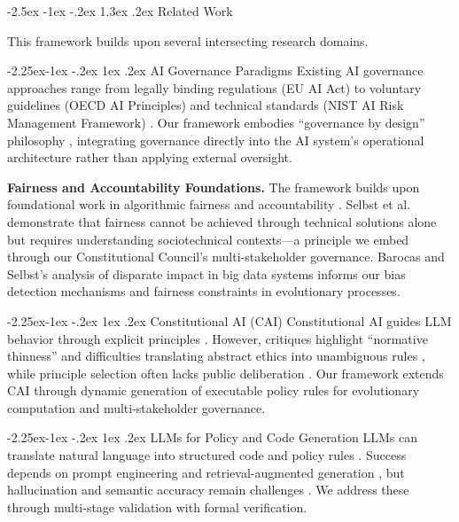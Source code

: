\documentclass[manuscript,screen,review,anonymous,9pt]{acmart}
\makeatletter
\renewcommand\section{\@startsection{section}{1}{\z@}%
  {-2.5ex \@plus -1ex \@minus -.2ex}%
  {1.3ex \@plus.2ex}%
  {\normalfont\Large\bfseries}}
\renewcommand\subsection{\@startsection{subsection}{2}{\z@}%
  {-2.25ex\@plus -1ex \@minus -.2ex}%
  {1ex \@plus .2ex}%
  {\normalfont\large\bfseries}}
\makeatother
\begin{document}
\section{Related Work}
\label{sec:related_work}

This framework builds upon several intersecting research domains.

\subsection{AI Governance Paradigms}
Existing AI governance approaches range from legally binding regulations (EU AI Act) to voluntary guidelines (OECD AI Principles) and technical standards (NIST AI Risk Management Framework) \cite{Wynants2025ETHICAL, WorldBank2024AIGovernance, CambridgeUP2024CorporateGovernance}. Our framework embodies ``governance by design'' philosophy \cite{Engin2025AdaptiveAIGovernance}, integrating governance directly into the AI system's operational architecture rather than applying external oversight.

\textbf{Fairness and Accountability Foundations.} The framework builds upon foundational work in algorithmic fairness and accountability \cite{Selbst2019FairnessAccountability, Barocas2016BigDataDisparate}. Selbst et al. demonstrate that fairness cannot be achieved through technical solutions alone but requires understanding sociotechnical contexts---a principle we embed through our Constitutional Council's multi-stakeholder governance. Barocas and Selbst's analysis of disparate impact in big data systems informs our bias detection mechanisms and fairness constraints in evolutionary processes.

\subsection{Constitutional AI (CAI)}
Constitutional AI guides LLM behavior through explicit principles \cite{Bai2025ConstitutionalAI}. However, critiques highlight ``normative thinness'' and difficulties translating abstract ethics into unambiguous rules \cite{DigiCon2025ConstitutionalAIThin, ChaconMenke2025CAISmallLLMs}, while principle selection often lacks public deliberation \cite{Hwang2025PublicCAI}. Our framework extends CAI through dynamic generation of executable policy rules for evolutionary computation and multi-stakeholder governance.

\subsection{LLMs for Policy and Code Generation}
LLMs can translate natural language into structured code and policy rules \cite{Almulla2024EmergenceLLMPolicy, ResearchGate2025AutoPAC, Li2025VeriCoder}. Success depends on prompt engineering and retrieval-augmented generation \cite{AnalyticsVidhya2024PromptingTechniques, arXiv2025FutureWorkRAG}, but hallucination and semantic accuracy remain challenges \cite{AAAI2025CodeHalu, Taeihagh2025Governing}. We address these through multi-stage validation with formal verification.
\end{document}
